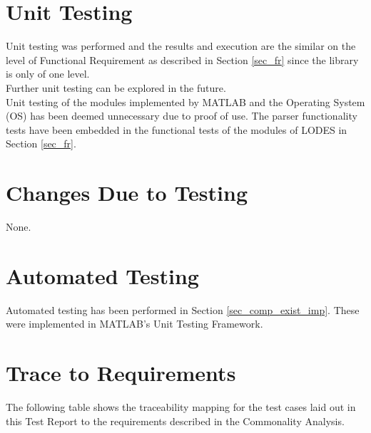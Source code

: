 \documentclass[12pt, titlepage]{article}
\newcommand{\famname}{LODES} %
\begin{document}
\section{Unit Testing} \label{sec_ut}
Unit testing was performed and the results and execution are the similar
on the level of Functional Requirement as described in Section \ref{sec_fr}
since the library is only of one level.\\

Further unit testing can be explored in the future.\\

Unit testing of the modules implemented by MATLAB and the Operating System (OS)
has been deemed unnecessary due to proof of use. The parser functionality
tests have been embedded in the functional tests of the modules of \famname{} in
Section \ref{sec_fr}.

\section{Changes Due to Testing} \label{sec_changes}

None.

\section{Automated Testing} \label{sec_at}

Automated testing has been performed in Section \ref{sec_comp_exist_imp}.
These were implemented in MATLAB's Unit Testing Framework.
		
\section{Trace to Requirements} \label{sec_trace_req}

The following table shows the traceability mapping for the test cases laid out in this Test Report to the requirements 
described in the Commonality Analysis.
\end{document}

